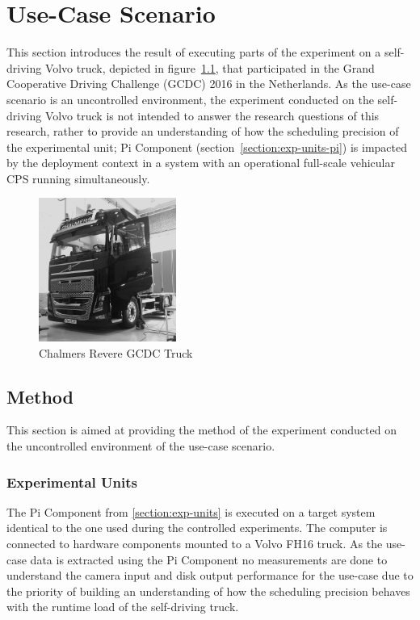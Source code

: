 \chapter{Use-Case Scenario}\label{section:data-validation}

This section introduces the result of executing parts of the experiment on a self-driving Volvo truck, depicted in figure~\ref{truck}, that participated in the Grand Cooperative Driving Challenge (GCDC) 2016 in the Netherlands. As the use-case scenario is an uncontrolled environment, the experiment conducted on the self-driving Volvo truck is not intended to answer the research questions of this research, rather to provide an understanding of how the scheduling precision of the experimental unit; Pi Component (section~\ref{section:exp-units-pi}) is impacted by the deployment context in a system with an operational full-scale vehicular CPS running simultaneously.\\

\begin{figure}[ht]
\centering
\caption{Chalmers Revere GCDC Truck}
\label{truck}
\includegraphics[width=0.4\textwidth]{./figure/truck.png}
\end{figure}


\section{Method}
\label{sec:truck-method}

This section is aimed at providing the method of the experiment conducted on the uncontrolled environment of the use-case scenario.


\subsection{Experimental Units}
\label{sec:truck-expun}

The Pi Component from \ref{section:exp-units} is executed on a target system identical to the one used during the controlled experiments. The computer is connected to hardware components mounted to a Volvo FH16 truck. As the use-case data is extracted using the Pi Component no measurements are done to understand the camera input and disk output performance for the use-case due to the priority of building an understanding of how the scheduling precision behaves with the runtime load of the self-driving truck.\\

